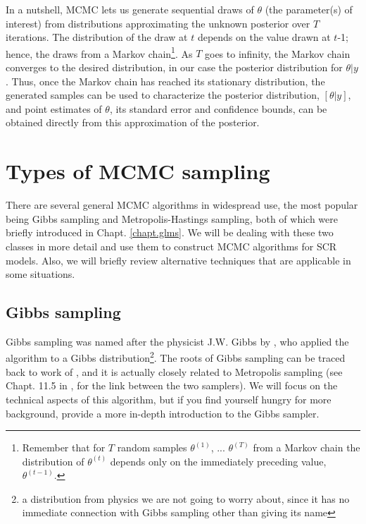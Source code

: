 In a nutshell, MCMC lets us generate sequential draws of $\theta$ (the
parameter(s) of interest) from distributions approximating the unknown
posterior over $T$ iterations. The distribution of the draw at $t$ depends
on the value drawn at $t$-1; hence, the draws from a Markov
chain\footnote{Remember that for
  $T$ random samples $\theta^ {(1)}$, ... $\theta^{(T)}$ from a Markov chain
  the distribution of $\theta^{(t)}$ depends only on the immediately preceding
  value, $\theta^{(t-1)}$.}. As $T$ goes to infinity, the Markov chain
converges to the desired distribution, in our case the posterior
distribution for $\theta|y$. Thus, once the Markov chain has reached
its stationary distribution, the generated samples can be used to
characterize the posterior distribution, $[\theta|y]$, and point
estimates of $\theta$, its standard error and confidence bounds, can
be obtained directly from this approximation of the posterior. 



\section{Types of MCMC sampling}

There are several general MCMC algorithms in widespread use, the most popular being Gibbs
sampling and Metropolis-Hastings sampling, both of which were briefly
introduced in Chapt. \ref{chapt.glms}. We will be dealing with these
two classes in more detail and use them to construct MCMC
algorithms for SCR models. Also, we will briefly review alternative
techniques that are applicable in some situations.


\subsection{Gibbs sampling}
\label{mcmc.sec.gibbs}

Gibbs sampling was named after the physicist J.W. Gibbs by
\citet{geman_geman:1984}, who applied the algorithm to a Gibbs
distribution\footnote{a distribution from physics we are not going to
  worry about, since it has no immediate connection with Gibbs
  sampling other than giving its name}. The roots of Gibbs sampling
can be traced back to work of \citet{metropolis_ulam:1953}, and it is
actually closely related to Metropolis sampling (see Chapt. 11.5 in
\citet{gelman_etal:2004}, for the link between the two samplers). We
will focus on the technical aspects of this algorithm, but if you find
yourself hungry for more background, \citet{casella_george:1992}
provide a more in-depth introduction to the Gibbs sampler.

